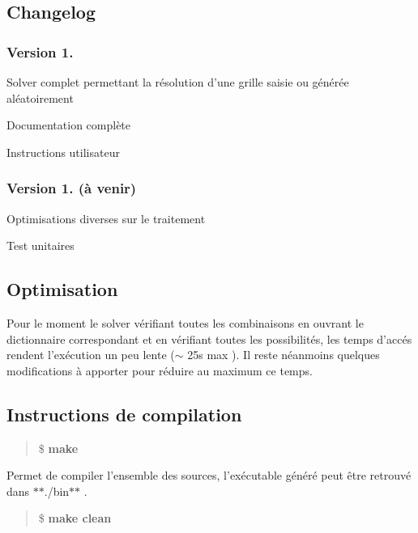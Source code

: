 \subsection*{Changelog}

\subsubsection*{Version 1.}


\begin{DoxyItemize}
\item Solver complet permettant la résolution d'une grille saisie ou générée aléatoirement
\item Documentation complète
\item Instructions utilisateur
\end{DoxyItemize}

\subsubsection*{Version 1. (à venir)}


\begin{DoxyItemize}
\item Optimisations diverses sur le traitement
\item Test unitaires
\end{DoxyItemize}

\subsection*{Optimisation}

Pour le moment le solver vérifiant toutes les combinaisons en ouvrant le dictionnaire correspondant et en vérifiant toutes les possibilités, les temps d'accés rendent l'exécution un peu lente ($\sim$ 25s max ). Il reste néanmoins quelques modifications à apporter pour réduire au maximum ce temps.

\subsection*{Instructions de compilation}

\begin{quote}
\$ {\bfseries make} \end{quote}


Permet de compiler l'ensemble des sources, l'exécutable généré peut être retrouvé dans $\ast$$\ast$./bin$\ast$$\ast$ .

\begin{quote}
\$ {\bfseries make clean} \end{quote}


